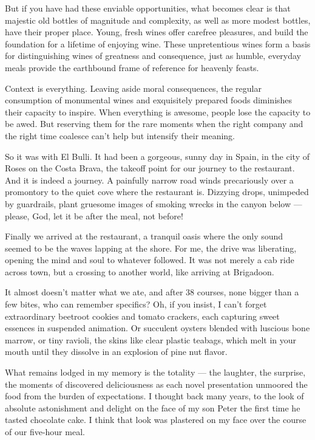 But if you have had these enviable opportunities, what becomes clear is
that majestic old bottles of magnitude and complexity, as well as more
modest bottles, have their proper place. Young, fresh wines offer
carefree pleasures, and build the foundation for a lifetime of enjoying
wine. These unpretentious wines form a basis for distinguishing wines of
greatness and consequence, just as humble, everyday meals provide the
earthbound frame of reference for heavenly feasts.

Context is everything. Leaving aside moral consequences, the regular
consumption of monumental wines and exquisitely prepared foods
diminishes their capacity to inspire. When everything is awesome, people
lose the capacity to be awed. But reserving them for the rare moments
when the right company and the right time coalesce can't help but
intensify their meaning.

So it was with El Bulli. It had been a gorgeous, sunny day in Spain, in
the city of Roses on the Costa Brava, the takeoff point for our journey
to the restaurant. And it is indeed a journey. A painfully narrow road
winds precariously over a promontory to the quiet cove where the
restaurant is. Dizzying drops, unimpeded by guardrails, plant gruesome
images of smoking wrecks in the canyon below --- please, God, let it be
after the meal, not before!

Finally we arrived at the restaurant, a tranquil oasis where the only
sound seemed to be the waves lapping at the shore. For me, the drive was
liberating, opening the mind and soul to whatever followed. It was not
merely a cab ride across town, but a crossing to another world, like
arriving at Brigadoon.

It almost doesn't matter what we ate, and after 38 courses, none bigger
than a few bites, who can remember specifics? Oh, if you insist, I can't
forget extraordinary beetroot cookies and tomato crackers, each
capturing sweet essences in suspended animation. Or succulent oysters
blended with luscious bone marrow, or tiny ravioli, the skins like clear
plastic teabags, which melt in your mouth until they dissolve in an
explosion of pine nut flavor.

What remains lodged in my memory is the totality --- the laughter, the
surprise, the moments of discovered deliciousness as each novel
presentation unmoored the food from the burden of expectations. I
thought back many years, to the look of absolute astonishment and
delight on the face of my son Peter the first time he tasted chocolate
cake. I think that look was plastered on my face over the course of our
five-hour meal.

